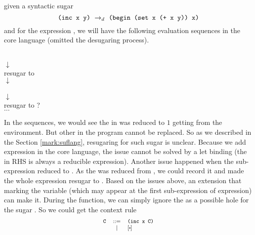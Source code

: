 given a syntactic sugar 
\[\texttt{(inc x y)} ~\rightarrow_d~ \texttt{(begin (set x (+ x y)) x)}\]
and for the expression , we will have the following evaluation sequences in the core language (omitted the desugaring process).
\begin{center}
	\\
	$\downarrow$\\
	 {\footnotesize resugar to }\\
	$\downarrow$\\
	 \\
	$\downarrow$\\
	 {\footnotesize resugar to ?}\\
	$\ldots$
\end{center}
In the sequences, we would see the  in  was reduced to $1$ getting from the environment. But other  in the program cannot be replaced. So as we described in the Section \ref{mark:suflang}, resugaring for such sugar is unclear. Because we add  expression in the core language, the issue cannot be solved by a let binding (the  in RHS is always a reducible expression). 
Another issue happened when the sub-expression  reduced to . As the  was reduced from , we could record it and made the whole expression resugar to . Based on the issues above, an extension that marking the variable (which may appear at the first sub-expression of  expression) can make it. During the  function, we can simply ignore the  as a possible hole for the sugar . So we could get the context rule 
\[
	{\footnotesize
	\begin{array}{lcl}
		\Code{C}&::=&\Code{(inc x C)}\\
		& | &[\bigcdot]
	\end{array}
	}
\]

